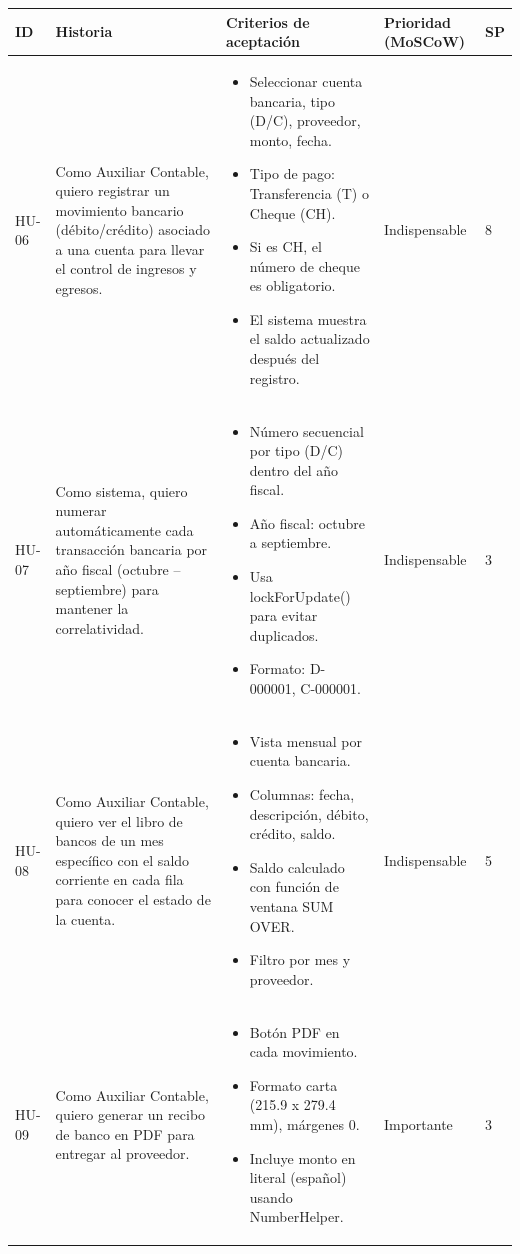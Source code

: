 \documentclass[stu]{apa7}
\begin{document}
\begin{longtable}{|L{0.8cm}|L{4.5cm}|L{3.5cm}|L{2cm}|L{1.5cm}|}
\hline
{}
\textbf{ID} & \textbf{Historia} & \textbf{Criterios de aceptación} & \textbf{Prioridad (MoSCoW)} & \textbf{SP} \\
\hline
\endhead
HU-06 & Como Auxiliar Contable, quiero registrar un movimiento bancario (débito/crédito) asociado a una cuenta para llevar el control de ingresos y egresos. & 
\begin{itemize}[nosep]
    \item Seleccionar cuenta bancaria, tipo (D/C), proveedor, monto, fecha.
    \item Tipo de pago: Transferencia (T) o Cheque (CH).
    \item Si es CH, el número de cheque es obligatorio.
    \item El sistema muestra el saldo actualizado después del registro.
\end{itemize} & Indispensable & 8 \\
\hline
HU-07 & Como sistema, quiero numerar automáticamente cada transacción bancaria por año fiscal (octubre -- septiembre) para mantener la correlatividad. & 
\begin{itemize}[nosep]
    \item Número secuencial por tipo (D/C) dentro del año fiscal.
    \item Año fiscal: octubre a septiembre.
    \item Usa lockForUpdate() para evitar duplicados.
    \item Formato: D-000001, C-000001.
\end{itemize} & Indispensable & 3 \\
\hline
HU-08 & Como Auxiliar Contable, quiero ver el libro de bancos de un mes específico con el saldo corriente en cada fila para conocer el estado de la cuenta. & 
\begin{itemize}[nosep]
    \item Vista mensual por cuenta bancaria.
    \item Columnas: fecha, descripción, débito, crédito, saldo.
    \item Saldo calculado con función de ventana SUM OVER.
    \item Filtro por mes y proveedor.
\end{itemize} & Indispensable & 5 \\
\hline
HU-09 & Como Auxiliar Contable, quiero generar un recibo de banco en PDF para entregar al proveedor. & 
\begin{itemize}[nosep]
    \item Botón PDF en cada movimiento.
    \item Formato carta (215.9 x 279.4 mm), márgenes 0.
    \item Incluye monto en literal (español) usando NumberHelper.
\end{itemize} & Importante & 3 \\
\hline
\end{longtable}
\end{document}
